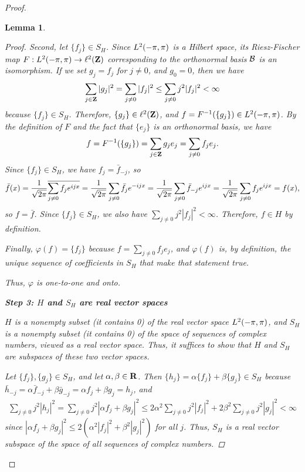\documentclass{homework}
\newtheorem{lemma}{Lemma}
\begin{document}
\begin{arabicparts}
\begin{proof}
\begin{lemma}
\begin{proof}
			Second, let $\{f_j\} \in S_H$. Since ${L^2(-\pi,\pi)}$ is a Hilbert space, its Riesz-Fischer map $F: {L^2(-\pi,\pi)} \to \ell^2(\textbf{Z})$ corresponding to the orthonormal basis $\mathcal{B}$ is an isomorphism. If we set $g_j = f_j$ for $j \ne 0$, and $g_0 = 0$, then we have
			\begin{equation}
				\sum_{j\in\textbf{Z}}|g_j|^2 = \sum_{j\ne 0}|f_j|^2 \le \sum_{j\ne 0}j^2|f_j|^2 < \infty
			\end{equation}
			because $\{f_j\} \in S_H$. Therefore, $\{g_j\} \in \ell^2(\textbf{Z})$, and $f = F^{-1}(\{g_j\}) \in {L^2(-\pi,\pi)}$. By the definition of $F$ and the fact that $\{e_j\}$ is an orthonormal basis, we have
			\begin{equation}
				f = F^{-1}(\{g_j\}) = \sum_{j\in\textbf{Z}}g_je_j = \sum_{j\ne 0}f_je_j.
			\end{equation}
			Since $\{f_j\} \in S_H$, we have $f_j = \bar{f}_{-j}$, so
			\begin{equation}
				\bar{f}(x) = \frac{1}{\sqrt{2\pi}}\overline{\sum_{j\ne0}f_je^{ijx}} = \frac{1}{\sqrt{2\pi}}\sum_{j\ne0}\bar{f}_je^{-ijx} = \frac{1}{\sqrt{2\pi}}\sum_{j\ne0}\bar{f}_{-j}e^{ijx} = \frac{1}{\sqrt{2\pi}}\sum_{j\ne0}f_je^{ijx} = f(x),
			\end{equation}
			so $f = \bar{f}$. Since $\{f_j\}\in S_H$, we also have $\sum\limits_{j\ne0}j^2|f_j|^2 < \infty$. Therefore, $f \in H$ by definition.
			
			Finally, $\varphi(f) = \{f_j\}$ because $f = \sum\limits_{j\ne 0}f_je_j$, and $\varphi(f)$ is, by definition, the unique sequence of coefficients in $S_H$ that make that statement true. 
			
			Thus, $\varphi$ is one-to-one and onto.
			
			\textbf{Step 3: $H$ and $S_H$ are real vector spaces}
			
			$H$ is a nonempty subset (it contains 0) of the real vector space ${L^2(-\pi,\pi)}$, and $S_H$ is a nonempty subset (it contains 0) of the space of sequences of complex numbers, viewed as a real vector space. Thus, it suffices to show that $H$ and $S_H$ are subspaces of these two vector spaces. 
			
			Let $\{f_j\}, \{g_j\} \in S_H$, and let $\alpha,\beta\in\textnormal{\bf R}$. Then $\{h_j\} = \alpha\{f_j\} + \beta\{g_j\} \in S_H$ because $\bar{h}_{-j} = \alpha\bar{f}_{-j} + \beta\bar{g}_{-j} = \alpha f_j + \beta g_j = h_j$, and
			\begin{align}
				\sum_{j\ne 0}j^2|h_j|^2 = \sum_{j\ne0}j^2|\alpha f_j +\beta g_j|^2 \le 2\alpha^2\sum_{j\ne0}j^2|f_j|^2 + 2\beta^2\sum_{j\ne0}j^2|g_j|^2 < \infty
			\end{align}
			since $|\alpha f_j + \beta g_j|^2 \le 2(\alpha^2|f_j|^2 + \beta^2|g_j|^2)$ for all $j$. Thus, $S_H$ is a real vector subspace of the space of all sequences of complex numbers.
			

\end{proof}
\end{lemma}
\end{proof}
\end{arabicparts}
\end{document}

